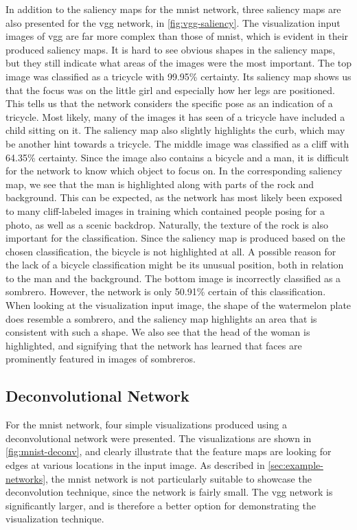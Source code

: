 \noindent In addition to the saliency maps for the \acrshort{mnist} network, three saliency maps are also presented for the \acrshort{vgg} network, in \autoref{fig:vgg-saliency}. The visualization input images of \acrshort{vgg} are far more complex than those of \acrshort{mnist}, which is evident in their produced saliency maps. It is hard to see obvious shapes in the saliency maps, but they still indicate what areas of the images were the most important. The top image was classified as a tricycle with 99.95\% certainty. Its saliency map shows us that the focus was on the little girl and especially how her legs are positioned. This tells us that the network considers the specific pose as an indication of a tricycle. Most likely, many of the images it has seen of a tricycle have included a child sitting on it. The saliency map also slightly highlights the curb, which may be another hint towards a tricycle. The middle image was classified as a cliff with 64.35\% certainty. Since the image also contains a bicycle and a man, it is difficult for the network to know which object to focus on. In the corresponding saliency map, we see that the man is highlighted along with parts of the rock and background. This can be expected, as the network has most likely been exposed to many cliff-labeled images in training which contained people posing for a photo, as well as a scenic backdrop. Naturally, the texture of the rock is also important for the classification. Since the saliency map is produced based on the chosen classification, the bicycle is not highlighted at all. A possible reason for the lack of a bicycle classification might be its unusual position, both in relation to the man and the background. The bottom image is incorrectly classified as a sombrero. However, the network is only 50.91\% certain of this classification. When looking at the visualization input image, the shape of the watermelon plate does resemble a sombrero, and the saliency map highlights an area that is consistent with such a shape. We also see that the head of the woman is highlighted, and signifying that the network has learned that faces are prominently featured in images of sombreros.

\subsection{Deconvolutional Network}

For the \acrshort{mnist} network, four simple visualizations produced using a deconvolutional network were presented. The visualizations are shown in \autoref{fig:mnist-deconv}, and clearly illustrate that the feature maps are looking for edges at various locations in the input image. As described in \autoref{sec:example-networks}, the \acrshort{mnist} network is not particularly suitable to showcase the deconvolution technique, since the network is fairly small. The \acrshort{vgg} network is significantly larger, and is therefore a better option for demonstrating the visualization technique. \\

